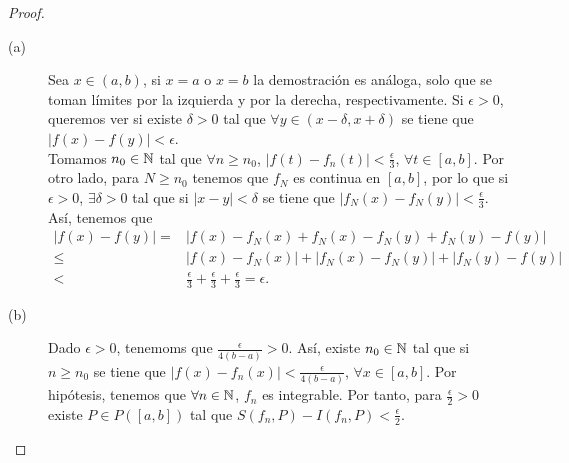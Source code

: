 \begin{proof}
\begin{description}
	\item[(a)] Sea $\displaystyle x \in \left(a,b\right)  $, si $\displaystyle x = a $ o $\displaystyle x = b $ la demostración es análoga, solo que se toman límites por la izquierda y por la derecha, respectivamente. Si $\displaystyle \epsilon > 0 $, queremos ver si existe $\displaystyle \delta > 0 $ tal que $\displaystyle \forall y \in \left(x-\delta, x + \delta \right) $ se tiene que $\displaystyle \left|f\left(x\right)-f\left(y\right)\right| < \epsilon  $. \\ 
		Tomamos $\displaystyle n_{0} \in \mathbb{N} $ tal que $\displaystyle \forall n \geq n_{0} $, $\displaystyle \left|f\left(t\right)-f_{n}\left(t\right)\right| < \frac{\epsilon }{3} $, $\displaystyle \forall t \in \left[a,b\right]  $. Por otro lado, para $\displaystyle N \geq n_{0} $ tenemos que $\displaystyle f_{N} $ es continua en $\displaystyle \left[a,b\right]  $, por lo que si $\displaystyle \epsilon > 0 $, $\displaystyle \exists \delta > 0 $ tal que si $\displaystyle \left|x-y\right|<\delta  $ se tiene que $\displaystyle \left|f_{N}\left(x\right)-f_{N}\left(y\right)\right| < \frac{\epsilon }{3} $. 
	Así, tenemos que  
	\[
	\begin{split}
		\left|f\left(x\right)-f\left(y\right)\right| = & \left|f\left(x\right) -f_{N}\left(x\right) + f_{N}\left(x\right) - f_{N}\left(y\right) + f_{N}\left(y\right)-f\left(y\right)\right| \\
	\leq & \left|f\left(x\right)-f_{N}\left(x\right)\right| + \left|f_{N}\left(x\right)-f_{N}\left(y\right)\right| + \left|f_{N}\left(y\right)-f\left(y\right)\right| \\
	< & \frac{\epsilon }{3} + \frac{\epsilon }{3} + \frac{\epsilon }{3} = \epsilon .
	\end{split}
	\]
\item[(b)] Dado $\displaystyle \epsilon > 0 $, tenemoms que $\displaystyle \frac{\epsilon }{4\left(b-a\right)} > 0 $. Así, existe $\displaystyle n_{0} \in \mathbb{N} $ tal que si $\displaystyle n \geq n_{0} $ se tiene que $\displaystyle \left|f\left(x\right)-f_{n}\left(x\right)\right| < \frac{\epsilon }{4\left(b-a\right)} $, $\displaystyle \forall x\in \left[a,b\right]  $. Por hipótesis, tenemos que $\displaystyle \forall n \in \mathbb{N} $, $\displaystyle f_{n} $ es integrable. Por tanto, para $\displaystyle \frac{\epsilon }{2} > 0 $ existe $\displaystyle P \in P\left(\left[a,b\right] \right) $ tal que $\displaystyle S\left(f_{n}, P\right)-I\left(f_{n}, P\right) < \frac{\epsilon }{2} $. 

\end{description}
\end{proof}
